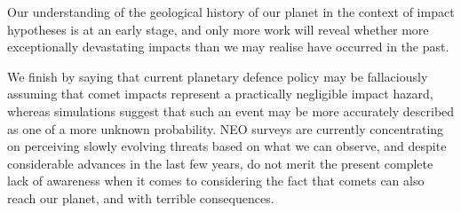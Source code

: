 Our understanding of the geological history of our planet in the context of impact hypotheses is at an early stage, and only more work will reveal whether more exceptionally devastating impacts than we may realise have occurred in the past.

We finish by saying that current planetary defence policy may be fallaciously assuming that comet impacts represent a practically negligible impact hazard, whereas simulations suggest that such an event may be more accurately described as one of a more unknown probability. NEO surveys are currently concentrating on perceiving slowly evolving threats based on what we can observe, and despite considerable advances in the last few years, do not merit the present complete lack of awareness when it comes to considering the fact that comets can also reach our planet, and with terrible consequences.
